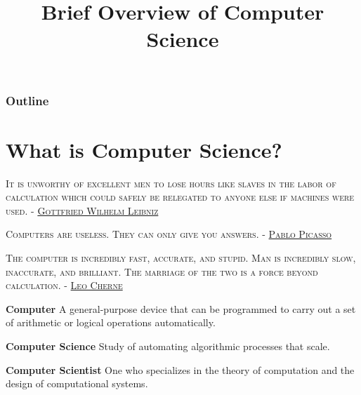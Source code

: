 \documentclass[8pt,a4paper,compress]{beamer}
\title{Brief Overview of Computer Science}
\date{}
\begin{document}
\begin{frame}
\vfill
\titlepage
\end{frame}

\begin{frame}
\frametitle{Outline}
\tableofcontents
\end{frame}

\section{What is Computer Science?}
\begin{frame}[fragile]
\begin{flushright}
\tiny \textsc{It is unworthy of excellent men to lose hours like slaves in the labor of calculation which could safely be relegated to anyone else if machines were used. - \href{http://en.wikipedia.org/wiki/Gottfried_Wilhelm_Leibniz}{Gottfried Wilhelm Leibniz}}

\bigskip

\tiny \textsc{Computers are useless. They can only give you answers. - \href{http://en.wikipedia.org/wiki/Pablo_Picasso}{Pablo Picasso}}

\bigskip

\textsc{The computer is incredibly fast, accurate, and stupid. Man is incredibly slow, inaccurate, and brilliant. The marriage of the two is a force beyond calculation. - \href{http://en.wikipedia.org/wiki/Leo_Cherne}{Leo Cherne}}
\end{flushright}

\pause
\textbf{Computer} A general-purpose device that can be programmed to carry out a set of arithmetic or logical operations automatically.

\pause
\smallskip

\textbf{Computer Science} Study of automating algorithmic processes that scale.

\pause
\smallskip

\textbf{Computer Scientist} One who specializes in the theory of computation and the design of computational systems.
\end{frame}
\end{document}
